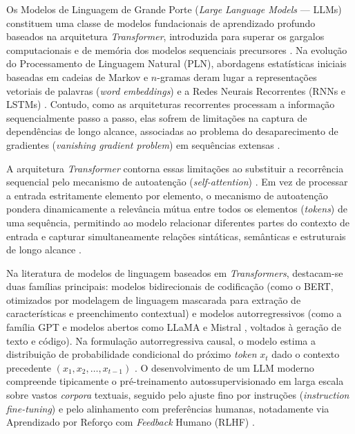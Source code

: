 Os Modelos de Linguagem de Grande Porte (\textit{Large Language Models} --- LLMs) constituem uma classe de modelos fundacionais de aprendizado profundo baseados na arquitetura \textit{Transformer}, introduzida para superar os gargalos computacionais e de memória dos modelos sequenciais precursores \cite{Gallotta_2024, maleki2024procedural}. Na evolução do Processamento de Linguagem Natural (PLN), abordagens estatísticas iniciais baseadas em cadeias de Markov e $n$-gramas deram lugar a representações vetoriais de palavras (\textit{word embeddings}) e a Redes Neurais Recorrentes (RNNs e LSTMs) \cite{Gallotta_2024, maleki2024procedural}. Contudo, como as arquiteturas recorrentes processam a informação sequencialmente passo a passo, elas sofrem de limitações na captura de dependências de longo alcance, associadas ao problema do desaparecimento de gradientes (\textit{vanishing gradient problem}) em sequências extensas \cite{maleki2024procedural}.

A arquitetura \textit{Transformer} contorna essas limitações ao substituir a recorrência sequencial pelo mecanismo de autoatenção (\textit{self-attention}) \cite{Gallotta_2024, maleki2024procedural}. Em vez de processar a entrada estritamente elemento por elemento, o mecanismo de autoatenção pondera dinamicamente a relevância mútua entre todos os elementos (\textit{tokens}) de uma sequência, permitindo ao modelo relacionar diferentes partes do contexto de entrada e capturar simultaneamente relações sintáticas, semânticas e estruturais de longo alcance \cite{Gallotta_2024, maleki2024procedural}.

Na literatura de modelos de linguagem baseados em \textit{Transformers}, destacam-se duas famílias principais: modelos bidirecionais de codificação (como o BERT, otimizados por modelagem de linguagem mascarada para extração de características e preenchimento contextual) \cite{Gallotta_2024, maleki2024procedural} e modelos autorregressivos (como a família GPT \cite{Gallotta_2024, maleki2024procedural} e modelos abertos como LLaMA e Mistral \cite{Gallotta_2024}, voltados à geração de texto e código). Na formulação autorregressiva causal, o modelo estima a distribuição de probabilidade condicional do próximo \textit{token} $x_t$ dado o contexto precedente $(x_1, x_2, \dots, x_{t-1})$ \cite{Gallotta_2024}. O desenvolvimento de um LLM moderno compreende tipicamente o pré-treinamento autossupervisionado em larga escala sobre vastos \textit{corpora} textuais, seguido pelo ajuste fino por instruções (\textit{instruction fine-tuning}) e pelo alinhamento com preferências humanas, notadamente via Aprendizado por Reforço com \textit{Feedback} Humano (RLHF) \cite{Gallotta_2024, her2025zeroshot3dmapgeneration}.

